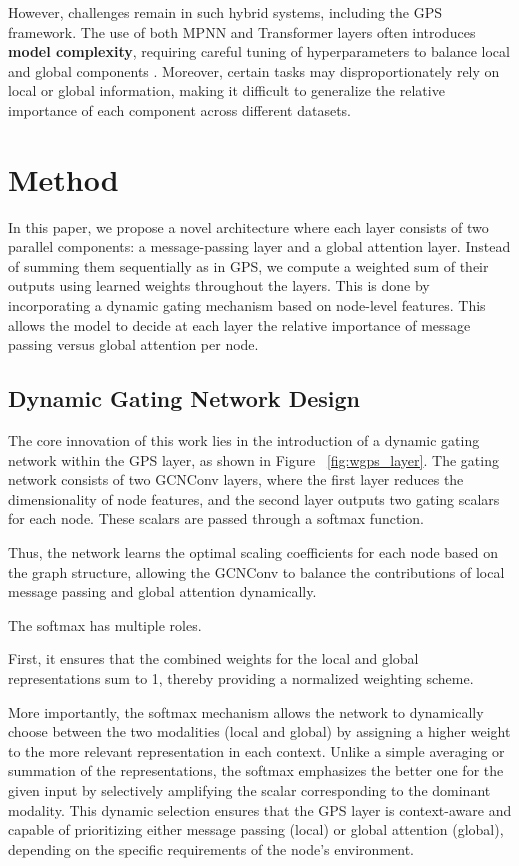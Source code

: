 \documentclass{acmart}
\begin{document}
However, challenges remain in such hybrid systems, including the GPS framework. The use of both MPNN and Transformer layers often introduces \textbf{model complexity}, requiring careful tuning of hyperparameters to balance local and global components \cite{rampášek2023recipegeneralpowerfulscalable}. Moreover, certain tasks may disproportionately rely on local or global information, making it difficult to generalize the relative importance of each component across different datasets.

\section{Method}

In this paper, we propose a novel architecture where each layer consists of two parallel components: a message-passing layer and a global attention layer. Instead of summing them sequentially as in GPS, we compute a weighted sum of their outputs using learned weights throughout the layers. This is done by incorporating a dynamic gating mechanism based on node-level features. This allows the model to decide at each layer the relative importance of message passing versus global attention per node.

\subsection{Dynamic Gating Network Design}

The core innovation of this work lies in the introduction of a dynamic gating network within the GPS layer, as shown in Figure ~\ref{fig:wgps_layer}. The gating network consists of two GCNConv layers, where the first layer reduces the dimensionality of node features, and the second layer outputs two gating scalars for each node. These scalars are passed through a softmax function.

Thus, the network learns the optimal scaling coefficients for each node based on the graph structure, allowing the GCNConv to balance the contributions of local message passing and global attention dynamically.

The softmax has multiple roles. 

First, it ensures that the combined weights for the local and global representations sum to 1, thereby providing a normalized weighting scheme. 

More importantly, the softmax mechanism allows the network to dynamically choose between the two modalities (local and global) by assigning a higher weight to the more relevant representation in each context. Unlike a simple averaging or summation of the representations, the softmax emphasizes the better one for the given input by selectively amplifying the scalar corresponding to the dominant modality. This dynamic selection ensures that the GPS layer is context-aware and capable of prioritizing either message passing (local) or global attention (global), depending on the specific requirements of the node’s environment.
\end{document}

